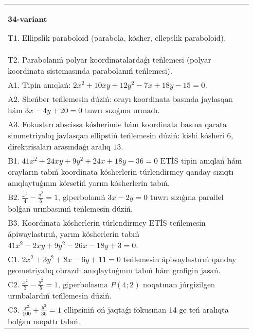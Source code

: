 \documentclass{article}
\begin{document}
\begin{tabular}{m{17cm}}
\textbf{34-variant}
\newline

T1. Ellipslik paraboloid (parabola, kósher, ellepslik paraboloid).\\

T2. Parabolanıń polyar koordinatalardaǵı teńlemesi (polyar koordinata sistemasında parabolanıń teńlemesi).\\

A1. Tipin anıqlań: $2 x^{2}+10 xy+12 y^{2}-7 x+18 y-15=0$.\\

A2. Sheńber teńlemesin dúziń: orayı koordinata basında jaylasqan hám $3 x-4 y+20=0$ tuwrı sızıǵına urınadı.\\

A3. Fokusları abscissa kósherinde hám koordinata basına qarata simmetriyalıq jaylasqan ellipstiń teńlemesin dúziń: kishi kósheri $6$, direktrisaları arasındaǵı aralıq $13$.\\

B1. $41x^{2} + 24xy + 9y^{2} + 24x + 18y - 36 = 0$ ETİS tipin anıqlań hám orayların tabıń koordinata kósherlerin túrlendirmey qanday sızıqtı anıqlaytuǵının kórsetiń yarım kósherlerin tabıń.  \\

B2. $\frac{x^{2}}{4} - \frac{y^{2}}{5} = 1$, giperbolanıń $3x - 2y = 0$ tuwrı sızıǵına parallel bolǵan urınbasınıń teńlemesin dúziń.  \\

B3. Koordinata kósherlerin túrlendirmey ETİS teńlemesin ápiwaylastırıń, yarım kósherlerin tabıń $41x^{2} + 2xy + 9y^{2} - 26x - 18y + 3 = 0$.  \\

C1. $2x^{2} + 3y^{2} + 8x - 6y + 11 = 0$ teńlemesin ápiwaylastırıń qanday geometriyalıq obrazdı anıqlaytuǵının tabıń hám grafigin jasań.  \\

C2. $\frac{x^{2}}{3} - \frac{y^{2}}{5} = 1$, giperbolasına $P(4;2)$ noqatınan júrgizilgen urınbalardıń teńlemesin dúziń.  \\

C3. $\frac{x^{2}}{100} + \frac{y^{2}}{36} = 1$ ellipsiniń oń jaqtaǵı fokusınan 14 ge teń aralıqta bolǵan noqattı tabıń.  \\

\end{tabular}
\vspace{1cm}
\end{document}
